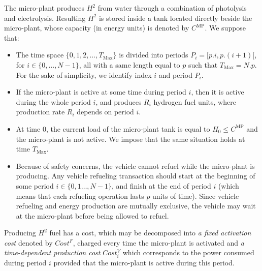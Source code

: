 \documentclass[11pt]{article}
\theoremstyle{plain}%
\theoremstyle{definition} \newtheorem{lem}{Lemma}[section]
\theoremstyle{definition} \newtheorem{claim}{Claim}[lem]
\theoremstyle{definition} \newtheorem{theorem}{Theorem}[section]
\theoremstyle{definition} \newtheorem{exo}{Exercice n$^\circ$}
\theoremstyle{definition} \newtheorem{quest}{}[exo]
\theoremstyle{definition} \newtheorem{sousquest}{}[quest]
\theoremstyle{remark}
\theoremstyle{definition}
\begin{document}
The micro-plant produces $H^2$ from water through a combination of photolysis and
electrolysis. Resulting $H^2$ is stored inside a tank located directly beside the micro-plant, whose capacity (in
energy units) is denoted by $C^{\textrm{MP}}$. We suppose that:
\begin{itemize}
\item The time space $\{0, 1, 2, \ldots, T_{\textrm{Max}} \}$ is divided into periods $P_i = [p.i, p.(i + 1)[$, for $ i \in \{0, \ldots, N - 1\}$, all with a same length equal to $p$ such that $T_{\textrm{Max}}= N.p$. For the sake of simplicity, we identify index $i$ and period $P_i$. 
\item If the micro-plant is active at some time during period $i$, then it is active during the whole period $i$, and produces $R_i$ hydrogen fuel units, where production rate $R_i$ depends on period $i$. 
\item At time $0$, the current load of the micro-plant tank is equal to $H_0 \le C^{\textrm{MP}}$ and the micro-plant is not active. We impose that the same situation holds at time $T_{\textrm{Max}}$.
\item Because of safety concerns, the vehicle cannot refuel while the micro-plant is producing. Any vehicle refueling transaction should start at the beginning of some period $i \in \{ 0, 1\ldots, N - 1 \}$, and finish at the end of
period $i$ (which means that each refueling operation lasts $p$ units of time). Since vehicle refueling and energy production are mutually exclusive, the vehicle may wait at
the micro-plant before being allowed to refuel.
\end{itemize}

Producing $H^2$ fuel has a cost, which may be decomposed into {\it a fixed activation cost} denoted by $Cost^F$, charged every time the micro-plant is activated and {\it a time-dependent production cost} $Cost^V_i$ which corresponds to the power consumed during period $i$ provided that the micro-plant is active during this period. 
\end{document}
